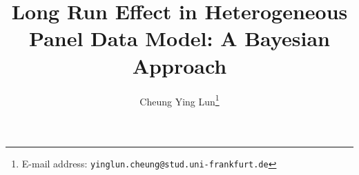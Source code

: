\documentclass[12pt]{article}
\numberwithin{equation}{section}
\numberwithin{table}{section}
\numberwithin{figure}{section}
\begin{document}

\title{Long Run Effect in Heterogeneous Panel Data Model: A Bayesian Approach}

\author{Cheung Ying Lun\thanks{E-mail address: \texttt{yinglun.cheung@stud.uni-frankfurt.de}}}
\affil{}

\date{}              %


\renewcommand{\thefootnote}{\fnsymbol{footnote}}

\singlespacing

\maketitle

\vspace{-.2in}


\medskip


\medskip

\thispagestyle{empty}

\clearpage

\onehalfspacing
\setcounter{footnote}{0}
\renewcommand{\thefootnote}{\arabic{footnote}}
\setcounter{page}{1}







\clearpage
\appendix

\clearpage
%

\clearpage
\appendix


\clearpage



\end{document}
